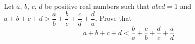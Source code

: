 Let $ a$,  $ b$,  $ c$,  $ d$ be positive real numbers such that $ abcd = 1$ and $ a + b + c + d > \dfrac{a}{b} + \dfrac{b}{c} + \dfrac{c}{d} + \dfrac{d}{a}$. Prove that\[ a + b + c + d < \dfrac{b}{a} + \dfrac{c}{b} + \dfrac{d}{c} + \dfrac{a}{d}\]